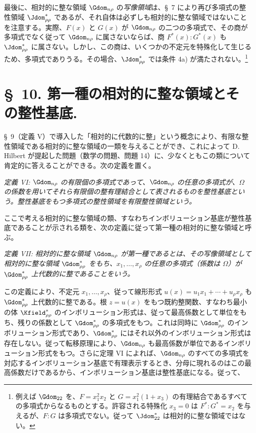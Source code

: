 \documentclass[11pt]{article}
\begin{document}
最後に、相対的に整な領域 $\Gdom_{n\rho}$ の\emph{写像領域}は、\S\ 7 により再び多項式の整性領域 $\Jdom^*_{\rho\rho}$ であるが、それ自体は必ずしも相対的に整な領域ではないことを注意する。実際、$F(x)$ と $G(x)$ が $\Gdom_{n\rho}$ の二つの多項式で、その商が多項式でなく従って $\Gdom_{n\rho}$ に属さないならば、商 $F^*(x):G^*(x)$ も $\Jdom^*_{\rho\rho}$ に属さない。しかし、この商は、いくつかの不定元を特殊化して生じるため、多項式でありうる。その場合、$\Jdom^*_{\rho\rho}$ では条件 4a) が満たされない。\footnote{例えば $\Gdom_{22}$ を、$F=x_1^2x_2$ と $G=x_1^2(1+x_3)$ の有理結合であるすべての多項式からなるものとする。許容される特殊化 $x_3=0$ は $F^*:G^*=x_2$ を与えるが、$F:G$ は多項式でない。従って $\Jdom^*_{22}$ は相対的に整な領域ではない。}

\section*{\S\ 10. 第一種の相対的に整な領域とその整性基底.}

\S\ 9（定義 V）で導入した「相対的に代数的に整」という概念により、有限な整性領域である相対的に整な領域の一類を与えることができ、これによって D. Hilbert が提起した問題（数学の問題、問題 14）に、少なくともこの類について肯定的に答えることができる。次の定義を置く。

\emph{定義 VI: $\Gdom_{n\rho}$ の有限個の多項式であって、$\Gdom_{n\rho}$ の任意の多項式が、$\Omega$ の係数を用いてそれら有限個の整有理結合として表されるものを整性基底という。整性基底をもつ多項式の整性領域を有限整性領域という。}

ここで考える相対的に整な領域の類、すなわちインボリューション基底が整性基底であることが示される類を、次の定義に従って第一種の相対的に整な領域と呼ぶ。

\emph{定義 VII: 相対的に整な領域 $\Gdom_{n\rho}$ が第一種であるとは、その写像領域として相対的に整な領域 $\Gdom^*_{\rho\rho}$ をもち、$x_1,\ldots,x_\rho$ の任意の多項式（係数は $\Omega$）が $\Gdom^*_{\rho\rho}$ 上代数的に整であることをいう。}

この定義により、不定元 $x_1,\ldots,x_\rho$、従って線形形式 $u(x)=u_1x_1+\cdots+u_\rho x_\rho$ も $\Gdom^*_{\rho\rho}$ 上代数的に整である。根 $z=u(x)$ をもつ既約整関数、すなわち最小の体 $\Kfield^*_{\rho\rho}$ のインボリューション形式は、従って最高係数として単位をもち、残りの係数として $\Gdom^*_{\rho\rho}$ の多項式をもつ。これは同時に $\Gdom^*_{\rho\rho}$ のインボリューション形式であり、$\Gdom^*_{\rho\rho}$ にはそれ以外のインボリューション形式は存在しない。従って転移原理により、$\Gdom_{n\rho}$ も最高係数が単位であるインボリューション形式をもつ。さらに定理 VI によれば、$\Gdom_{n\rho}$ のすべての多項式を対応するインボリューション基底で有理表示するとき、分母に現れるのはこの最高係数だけであるから、インボリューション基底は整性基底になる。従って、
\end{document}
